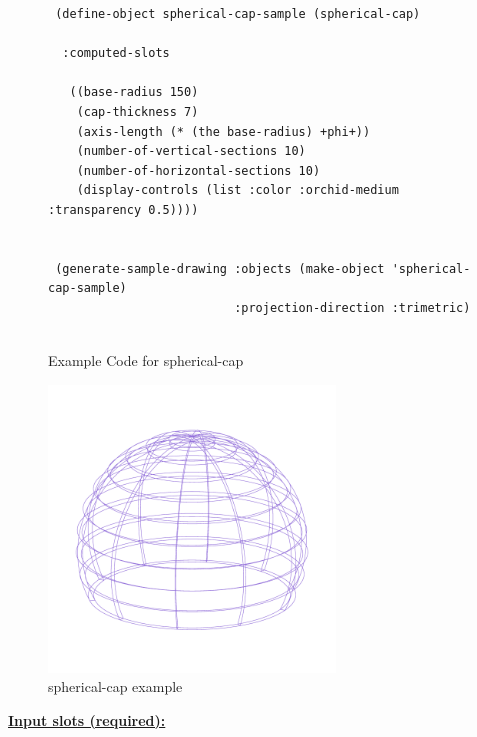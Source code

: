 \documentclass [11pt]{book}
\begin{document}
\begin{itemize}
\begin{figure}
\begin{lrbox}{\boxedverb}
\begin{minipage}{\linewidth}
{\begin{verbatim}
 (define-object spherical-cap-sample (spherical-cap)
   
  :computed-slots

   ((base-radius 150)
    (cap-thickness 7)
    (axis-length (* (the base-radius) +phi+))
    (number-of-vertical-sections 10)
    (number-of-horizontal-sections 10)
    (display-controls (list :color :orchid-medium :transparency 0.5))))
  

 (generate-sample-drawing :objects (make-object 'spherical-cap-sample) 
                          :projection-direction :trimetric)
                  

\end{verbatim}}
\end{minipage}
\end{lrbox}
\fbox{\usebox{\boxedverb}}

\caption{Example Code for spherical-cap}

\label{fig:example-code-spherical-cap}

\end{figure}

\begin{figure}
\begin{center}
\includegraphics[width=3in,height=3in]{../images/example-spherical-cap.pdf}
\end{center}

\caption{spherical-cap example}

\label{fig:spherical-cap}

\end{figure}





\textbf{
\underline{Input slots (required):}}

\begin{description}


\end{description}
\end{itemize}
\end{document}
